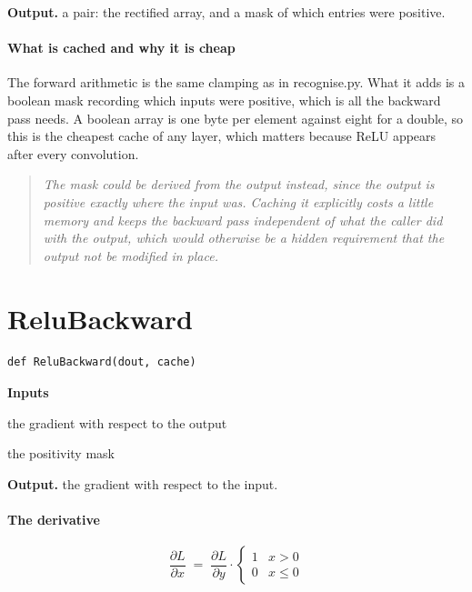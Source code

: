 \noindent\textbf{Output.} a pair: the rectified array, and a mask of which entries were positive.


\paragraph{What is cached and why it is cheap}
The forward arithmetic is the same clamping as in recognise.py. What it adds is a boolean mask recording which inputs were positive, which is all the backward pass needs. A boolean array is one byte per element against eight for a double, so this is the cheapest cache of any layer, which matters because ReLU appears after every convolution.


\begin{quote}\small\itshape The mask could be derived from the output instead, since the output is positive exactly where the input was. Caching it explicitly costs a little memory and keeps the backward pass independent of what the caller did with the output, which would otherwise be a hidden requirement that the output not be modified in place.\end{quote}

\section{ReluBackward}
\begin{lstlisting}[style=sig]
def ReluBackward(dout, cache)
\end{lstlisting}

\noindent\textbf{Inputs}
\begin{description}[leftmargin=2.2em,style=nextline,font=\normalfont\ttfamily]\setlength\itemsep{1pt}
  \item[{dout}] \normalfont the gradient with respect to the output
  \item[{cache}] \normalfont the positivity mask
\end{description}

\noindent\textbf{Output.} the gradient with respect to the input.


\paragraph{The derivative}

\begin{equation}
\frac{\partial L}{\partial x} \;=\; \frac{\partial L}{\partial y} \cdot \begin{cases} 1 & x > 0 \\ 0 & x \le 0 \end{cases}
\end{equation}

